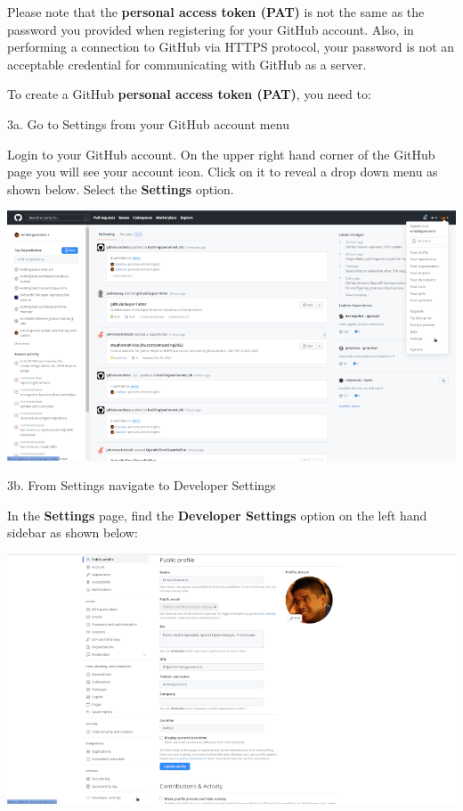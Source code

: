 \documentclass[
  12pt,
]{book}
\begin{document}
Please note that the \textbf{personal access token (PAT)} is not the same as the password you provided when registering for your GitHub account. Also, in performing a connection to GitHub via HTTPS protocol, your password is not an acceptable credential for communicating with GitHub as a server.

To create a GitHub \textbf{personal access token (PAT)}, you need to:

3a. Go to Settings from your GitHub account menu

Login to your GitHub account. On the upper right hand corner of the GitHub page you will see your account icon. Click on it to reveal a drop down menu as shown below. Select the \textbf{Settings} option.

\includegraphics{images/github_pat2.png}

3b. From Settings navigate to Developer Settings

In the \textbf{Settings} page, find the \textbf{Developer Settings} option on the left hand sidebar as shown below:

\includegraphics{images/github_pat3.png}
\end{document}
